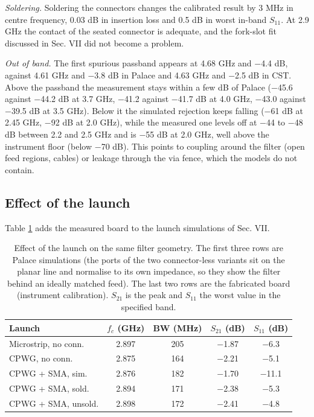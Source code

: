\documentclass{ieeeaccess}
\begin{document}
\emph{Soldering.} Soldering the connectors changes the calibrated result by
3 MHz in centre frequency, 0.03 dB in insertion loss and 0.5 dB in worst
in-band \(S_{11}\). At 2.9 GHz the contact of the seated connector is adequate,
and the fork-slot fit discussed in Sec. VII did not become a problem.

\emph{Out of band.} The first spurious passband appears at 4.68 GHz and \ensuremath{-}4.4 dB,
against 4.61 GHz and \ensuremath{-}3.8 dB in Palace and 4.63 GHz and \ensuremath{-}2.5 dB in CST. Above the
passband the measurement stays within a few dB of Palace (\ensuremath{-}45.6 against
\ensuremath{-}44.2 dB at 3.7 GHz, \ensuremath{-}41.2 against \ensuremath{-}41.7 dB at 4.0 GHz, \ensuremath{-}43.0 against \ensuremath{-}39.5 dB at
3.5 GHz). Below it the simulated rejection keeps falling (\ensuremath{-}61 dB at 2.45 GHz,
\ensuremath{-}92 dB at 2.0 GHz), while the measured one levels off at \ensuremath{-}44 to \ensuremath{-}48 dB between
2.2 and 2.5 GHz and is \ensuremath{-}55 dB at 2.0 GHz, well above the instrument floor
(below \ensuremath{-}70 dB). This points to coupling around the filter
(open feed regions, cables) or leakage through the via fence, which the models
do not contain.

\hypertarget{effect-of-the-launch}{%
\subsection{Effect of the launch}\label{effect-of-the-launch}}

Table \ref{tab:launch} adds the measured board to the launch simulations of
Sec. VII.

\begin{table}[t]
\centering
\scriptsize
\setlength{\tabcolsep}{2.5pt}
\caption{Effect of the launch on the same filter geometry. The first three rows are Palace simulations (the ports of the two connector-less variants sit on the planar line and normalise to its own impedance, so they show the filter behind an ideally matched feed). The last two rows are the fabricated board (instrument calibration). $S_{21}$ is the peak and $S_{11}$ the worst value in the specified band.}
\label{tab:launch}
\begin{tabular}{lcccc}
\hline
\textbf{Launch} & $f_c$ (GHz) & \textbf{BW (MHz)} & $S_{21}$ (dB) & $S_{11}$ (dB) \\
\hline
Microstrip, no conn. & 2.897 & 205 & $-$1.87 & $-$6.3 \\
CPWG, no conn. & 2.875 & 164 & $-$2.21 & $-$5.1 \\
CPWG + SMA, sim. & 2.876 & 182 & $-$1.70 & $-$11.1 \\
CPWG + SMA, sold. & 2.894 & 171 & $-$2.38 & $-$5.3 \\
CPWG + SMA, unsold. & 2.898 & 172 & $-$2.41 & $-$4.8 \\
\hline
\end{tabular}
\end{table}
\end{document}
